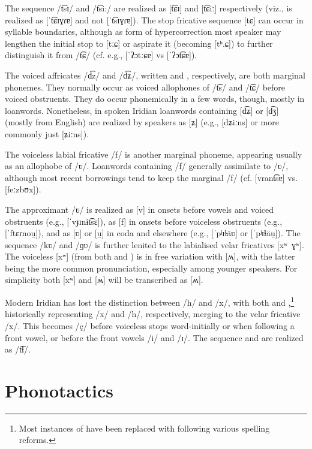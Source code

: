 The sequence /t͡sɪ/ and /t͡si:/ are realized as [t͡ɕɪ] and [t͡ɕiː] respectively
(viz.,  is realized as [ˈt͡ɕɪɣɾɐ] and not [ˈt͡sɪɣɾɐ]). The
stop fricative sequence [tɕ] can occur in syllable boundaries, although as form
of hypercorrection most speaker may lengthen the initial stop to [tːɕ] or
aspirate it (becoming [tʰ.ɕ]) to further distinguish it from /t͡ɕ/ (cf. e.g.,
 [ˈʔɔtːɕɐ] vs  [ˈʔɔt͡ɕɐ]).

The voiced affricates /d͡z/ and /d͡ʑ/, written  and ,
respectively, are both marginal phonemes. They normally occur as voiced
allophones of  /t͡s/ and /t͡ɕ/ before voiced obstruents. They do occur
phonemically in a few words, though, mostly in loanwords. Nonetheless, in spoken
Iridian loanwords containing [d͡ʑ] or [d͡ʒ] (mostly from English) are realized
by speakers as [ʑ] (e.g.,  [dʑiːns] or more commonly just
[ʑiːns]).

The voiceless labial fricative /f/ is another marginal phoneme, appearing
usually as an allophobe of /ʋ/. Loanwords containing /f/ generally assimilate to
/ʋ/, although most recent borrowings tend to keep the marginal /f/ (cf.
 [vɾant͡sɐ] vs.  [feːzbʊx]).

The approximant /ʋ/ is realized as [v] in onsets before vowels and voiced
obstruents (e.g.,  [ˈvɟɪnɨt͡sɛ]), as [f] in
onsets before voiceless obstruents (e.g.,  [ˈftɛɾnou̯]),
and as [ʋ] or [u̯] in coda and elsewhere (e.g.,  [ˈpʲɪɫäʋ]
or [ˈpʲɪɫäu̯]). The sequence /kʋ/ and /ɡʋ/ is further lenited to the labialised
velar fricatives [xʷ~ɣʷ]. The voiceless [xʷ] (from both  and )
is in free variation with [ʍ], with the latter being the more common
pronunciation, especially among younger speakers. For simplicity both [xʷ] and
[ʍ] will be transcribed as [ʍ].

Modern Iridian has lost the distinction between /h/ and /x/, with both 
and ,\footnote{Most instances of  have been replaced with
 following various spelling reforms.} historically representing /x/ and
/h/, respectively, merging to the velar fricative /x/. This becomes /ç/ before
voiceless stops word-initially or when following a front vowel, or before the
front vowels /i/ and /ɪ/. The sequence  and  are realized as
/t͡ɬ/.

\section{Phonotactics}\label{sec:phonotactics}

